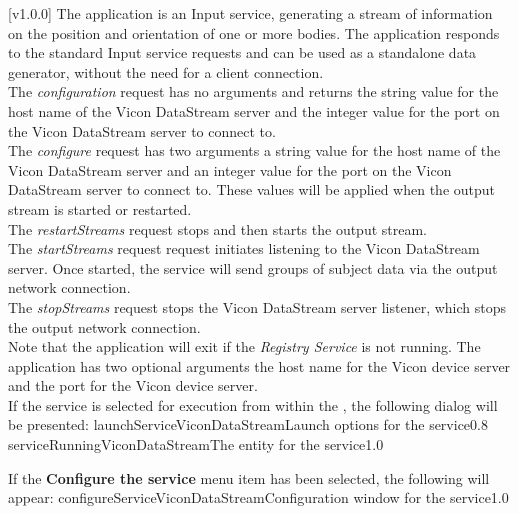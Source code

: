 [v1.0.0]
The  application is an Input service,
generating a stream of information on the position and orientation of one or more bodies.
The application responds to the standard Input service requests and can be used as a
standalone data generator, without the need for a client connection.\\

The \emph{configuration} request has no arguments and returns the string value for the
host name of the Vicon DataStream server and the integer value for the port on the Vicon
DataStream server to connect to.\\

The \emph{configure} request has two arguments \longDash{} a string value for the host
name of the Vicon DataStream server and an integer value for the port on the Vicon
DataStream server to connect to.
These values will be applied when the output stream is started or restarted.\\ 

The \emph{restartStreams} request stops and then starts the output stream.\\

The \emph{startStreams} request request initiates listening to the Vicon DataStream
server.
Once started, the service will send groups of subject data via the output \yarp{} network
connection.\\

The \emph{stopStreams} request stops the Vicon DataStream server listener, which stops the
output \yarp{} network connection.\\ 

Note that the application will exit if the \emph{Registry Service} is not running.
The application has two optional arguments \longDash{} the host name for the Vicon device
server and the port for the Vicon device server.
\insertAppParameters
\insertTagDescription{\VDSI}
\insertInputServiceComment\\

\insertStandardServiceCommands
\secondaryEnd
{}
If the service is selected for execution from within the \emph{\MMMU}, the following
dialog will be presented:
%
{launchServiceViconDataStream}{Launch options for the \VDSI{} service}{0.8}
\condPage
{}%
{serviceRunningViconDataStream}{The \emph{\MMMU} entity for the \VDSI{} service}{1.0}

If the \textbf{Configure the service} menu item has been selected, the following will
appear:
%
{configureServiceViconDataStream}{Configuration window for the \emph{\VDSI} service}{1.0}
\secondaryEnd
\primaryEnd{}
